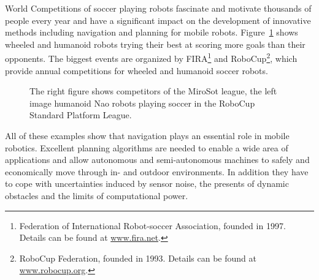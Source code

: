 \begin{description}
World Competitions of soccer playing robots fascinate and motivate thousands of people every year and have a significant impact on the development of innovative methods including navigation and planning for mobile robots.
Figure~\ref{fig:fig_competition} shows wheeled and humanoid robots trying their best at scoring more goals than their opponents.
The biggest events are organized by FIRA\footnote{Federation of International Robot-soccer Association, founded in 1997. Details can be found at \url{www.fira.net}.} and RoboCup\footnote{RoboCup Federation, founded in 1993. Details can be found at \url{www.robocup.org}.}, which provide annual competitions for wheeled and humanoid soccer robots.

\begin{figure}[thpb]
	  \myfloatalign
      \footnotesize
      \centering
   \caption[Soccer robots]{The right figure shows competitors of the MiroSot league, the left image humanoid Nao robots playing soccer in the RoboCup Standard Platform League.}
   \label{fig:fig_competition}
\end{figure}
\end{description}

All of these examples show that navigation plays an essential role in mobile robotics. Excellent planning algorithms are needed to enable a wide area of applications and allow autonomous and semi-autonomous machines to safely and economically move through in- and outdoor environments.
In addition they have to cope with uncertainties induced by sensor noise, the presents of dynamic obstacles and the limits of computational power.

